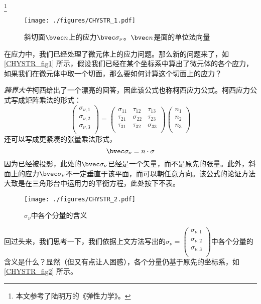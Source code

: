 
\footnote{本文参考了陆明万的《弹性力学》。}

\begin{figure}[ht]
\centering
\texttt{[image: ./figures/CHYSTR\_1.pdf]}
\caption{斜切面$\bvec n$上的应力$\bvec \sigma_\nu$。$\bvec n$是面的单位法向量} \label{CHYSTR_fig1}
\end{figure}

在应力中，我们已经处理了微元体上的应力问题。那么新的问题来了，如\autoref{CHYSTR_fig1} 所示，假设我们已经在某个坐标系中算出了微元体的各个应力，如果我们在微元体中取一个切面，那么要如何计算这个切面上的应力？

\textsl{跨界大牛}柯西给出了一个漂亮的回答，因此该公式也称柯西应力公式。柯西应力公式写成矩阵乘法的形式：
\begin{equation}\label{CHYSTR_eq1}
\begin{pmatrix}
\sigma_{\nu,1}\\
\sigma_{\nu,2}\\
\sigma_{\nu,3}\\
\end{pmatrix}
=
\begin{pmatrix}
\sigma_{11} & \tau_{12} & \tau_{13} \\
\tau_{21} & \sigma_{22} & \tau_{23} \\
\tau_{31} & \tau_{32} & \sigma_{33} \\
\end{pmatrix}
\begin{pmatrix}
n_1\\
n_2\\
n_3\\
\end{pmatrix}
\end{equation}
还可以写成更紧凑的张量乘法形式，
\begin{equation}
\bvec \sigma_\nu = n \cdot \sigma
\end{equation}
因为已经被投影，此处的$\bvec \sigma_\nu$已经是一个矢量，而不是原先的张量。此外，斜面上的应力$\bvec \sigma_\nu$不一定垂直于该平面，而可以朝任意方向。该公式的论证方法大致是在三角形台中运用力的平衡方程，此处按下不表。

\begin{figure}[ht]
\centering
\texttt{[image: ./figures/CHYSTR\_2.pdf]}
\caption{$\sigma_\nu$中各个分量的含义} \label{CHYSTR_fig2}
\end{figure}

回过头来，我们思考一下，我们依据上文方法写出的$\sigma_\nu=
\begin{pmatrix}
\sigma_{\nu,1}\\
\sigma_{\nu,2}\\
\sigma_{\nu,3}\\
\end{pmatrix}$中各个分量的含义是什么？显然（但又有点让人困惑），各个分量仍基于原先的坐标系，如\autoref{CHYSTR_fig2} 所示。

